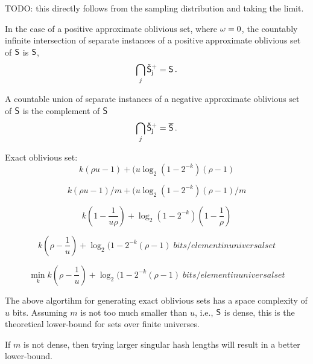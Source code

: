 \documentclass[ ../main.tex]{subfiles}
\begin{document}
TODO: this directly follows from the sampling distribution and taking the limit.

In the case of a positive approximate oblivious set, where $\omega = 0$, the countably infinite intersection of separate instances of a positive approximate oblivious set of $\Set{S}$ is $\Set{S}$,
\begin{equation}
    \bigcap_{j} \OPASet{S}[j] = \Set{S}\,.
\end{equation}

A countable union of separate instances of a negative approximate oblivious set of $\Set{S}$ is the complement of $\Set{S}$
\begin{equation}
    \bigcap_{j} \ONASet{S}[j] = \Set{\SetComplement[S]}\,.
\end{equation}



Exact oblivious set:
\begin{equation}
    k (\rho u - 1) + (u \log_2(1 - 2^{-k})(\rho - 1)
\end{equation}

\begin{equation}
    k (\rho u - 1)/m + (u \log_2(1 - 2^{-k})(\rho - 1)/m
\end{equation}

\begin{equation}
    k\left(1 - \frac{1}{u \rho}\right) + \log_2\!\left(1 - 2^{-k}\right)\left(1 - \frac{1}{\rho}\right)
\end{equation}

\begin{equation}
    k (\rho - \frac{1}{u}) + \log_2(1 - 2^{-k}(\rho - 1) \; \si{bits \per element in universal set}
\end{equation}


\begin{theorem}
\begin{equation}
    \min_k k (\rho - \frac{1}{u}) + \log_2(1 - 2^{-k}(\rho - 1) \; \si{bits \per element in universal set}
\end{equation}
\end{theorem}



The above algortihm for generating exact oblivious sets has a space complexity of $u$ bits. Assuming $m$ is not too much smaller than $u$, i.e., $\Set{S}$ is dense, this is the theoretical lower-bound for sets over finite universes.

If $m$ is not dense, then trying larger singular hash lengths will result in a better lower-bound.
\end{document}
